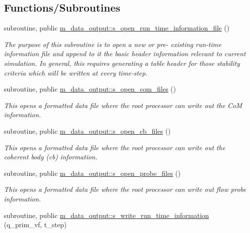 \subsection*{Functions/\+Subroutines}
\begin{DoxyCompactItemize}
\item 
subroutine, public \hyperlink{namespacem__data__output_a050b4b01f11c1d352f55b46b6514634d}{m\+\_\+data\+\_\+output\+::s\+\_\+open\+\_\+run\+\_\+time\+\_\+information\+\_\+file} ()
\begin{DoxyCompactList}\small\item\em The purpose of this subroutine is to open a new or pre-\/ existing run-\/time information file and append to it the basic header information relevant to current simulation. In general, this requires generating a table header for those stability criteria which will be written at every time-\/step. \end{DoxyCompactList}\item 
subroutine, public \hyperlink{namespacem__data__output_a36714d4cf746d5beb2736752fdd6d747}{m\+\_\+data\+\_\+output\+::s\+\_\+open\+\_\+com\+\_\+files} ()
\begin{DoxyCompactList}\small\item\em This opens a formatted data file where the root processor can write out the CoM information. \end{DoxyCompactList}\item 
subroutine, public \hyperlink{namespacem__data__output_a411af1336ca1bc899d3b7352d9383a81}{m\+\_\+data\+\_\+output\+::s\+\_\+open\+\_\+cb\+\_\+files} ()
\begin{DoxyCompactList}\small\item\em This opens a formatted data file where the root processor can write out the coherent body (cb) information. \end{DoxyCompactList}\item 
subroutine, public \hyperlink{namespacem__data__output_af469c3d867d96eb1ca255832e586ec97}{m\+\_\+data\+\_\+output\+::s\+\_\+open\+\_\+probe\+\_\+files} ()
\begin{DoxyCompactList}\small\item\em This opens a formatted data file where the root processor can write out flow probe information. \end{DoxyCompactList}\item 
subroutine, public \hyperlink{namespacem__data__output_a33a72559ec5cfdedf7162a8269d41201}{m\+\_\+data\+\_\+output\+::s\+\_\+write\+\_\+run\+\_\+time\+\_\+information} (q\+\_\+prim\+\_\+vf, t\+\_\+step)

\end{DoxyCompactItemize}
